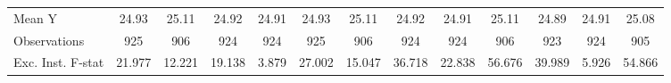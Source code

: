 {\begin{tabular}{l*{12}{c}}
\midrule
Mean Y      &       24.93         &       25.11         &       24.92         &       24.91         &       24.93         &       25.11         &       24.92         &       24.91         &       25.11         &       24.89         &       24.91         &       25.08         \\
Observations&         925         &         906         &         924         &         924         &         925         &         906         &         924         &         924         &         906         &         923         &         924         &         905         \\
Exc. Inst. F-stat&      21.977         &      12.221         &      19.138         &       3.879         &      27.002         &      15.047         &      36.718         &      22.838         &      56.676         &      39.989         &       5.926         &      54.866         \\
\bottomrule
\end{tabular}
}
